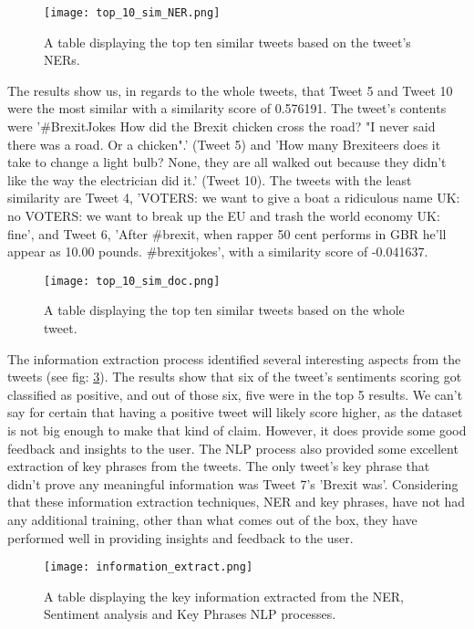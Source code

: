 	
	\begin{figure}[h]
		\centering
		\texttt{[image: top\_10\_sim\_NER.png]}
		\caption{A table displaying the top ten similar tweets based on the tweet's NERs.}
		\label{fig:top_10_sim_NER}
		
	\end{figure}

	The results show us, in regards to the whole tweets, that Tweet 5 and Tweet 10 were the most similar with a similarity score of 0.576191. The tweet's contents were '\#BrexitJokes How did the Brexit chicken cross the road? "I never said there was a road. Or a chicken".' (Tweet 5) and 'How many Brexiteers does it take to change a light bulb? None, they are all walked out because they didn't like the way the electrician did it.' (Tweet 10). The tweets with the least similarity are Tweet 4, 'VOTERS: we want to give a boat a ridiculous name UK: no VOTERS: we want to break up the EU and trash the world economy UK: fine', and Tweet 6, 'After \#brexit, when rapper 50 cent performs in GBR he'll appear as 10.00 pounds. \#brexitjokes', with a similarity score of -0.041637.

	\begin{figure}[h]
		\centering
		\texttt{[image: top\_10\_sim\_doc.png]}
		\caption{A table displaying the top ten similar tweets based on the whole tweet.}
		\label{fig:top_10_sim_doc}
		
	\end{figure}

	The information extraction process identified several interesting aspects from the tweets (see fig: \ref{fig:information_extract}). The results show that six of the tweet's sentiments scoring got classified as positive, and out of those six, five were in the top 5 results. We can't say for certain that having a positive tweet will likely score higher, as the dataset is not big enough to make that kind of claim. However, it does provide some good feedback and insights to the user. The NLP process also provided some excellent extraction of key phrases from the tweets. The only tweet's key phrase that didn't prove any meaningful information was Tweet 7's 'Brexit was'. Considering that these information extraction techniques, NER and key phrases, have not had any additional training, other than what comes out of the box, they have performed well in providing insights and feedback to the user.


	\begin{figure}[h]
		\centering
		\texttt{[image: information\_extract.png]}
		\caption{A table displaying the key information extracted from the NER, Sentiment analysis and Key Phrases NLP processes.}
		\label{fig:information_extract}
		
	\end{figure}

